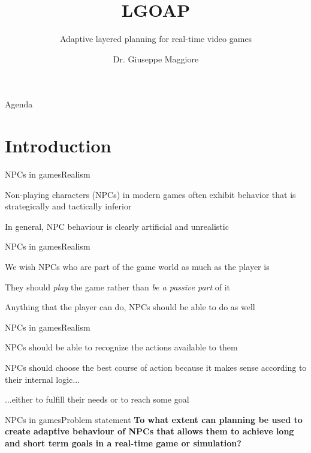 \documentclass{beamer}
\title{LGOAP}
\subtitle{Adaptive layered planning for real-time video games}
\author{Dr. Giuseppe Maggiore}
\institute{NHTV University of Applied Sciences \\ 
Breda, Netherlands}
\date{}
\begin{document}
\maketitle

\begin{frame}{Agenda}
\tableofcontents
\end{frame}

\section{Introduction}
\begin{slide}{NPCs in games}{Realism}{
\item Non-playing characters (NPCs) in modern games often exhibit behavior that is strategically and tactically inferior
\item In general, NPC behaviour is clearly artificial and unrealistic
}\end{slide}

\begin{slide}{NPCs in games}{Realism}{
\item We wish NPCs who are part of the game world as much as the player is
\item They should \textit{play} the game rather than \textit{be a passive part} of it
\item Anything that the player can do, NPCs should be able to do as well
}\end{slide}

\begin{slide}{NPCs in games}{Realism}{
\item NPCs should be able to recognize the actions available to them
\item NPCs should choose the best course of action because it makes sense according to their internal logic...
\item ...either to fulfill their needs or to reach some goal
}\end{slide}

\begin{textslide}{NPCs in games}{Problem statement}{
\textbf{To what extent can planning be used to create adaptive behaviour of NPCs that allows them to achieve long and short term goals in a real-time game or simulation?}
}\end{textslide}
\end{document}
